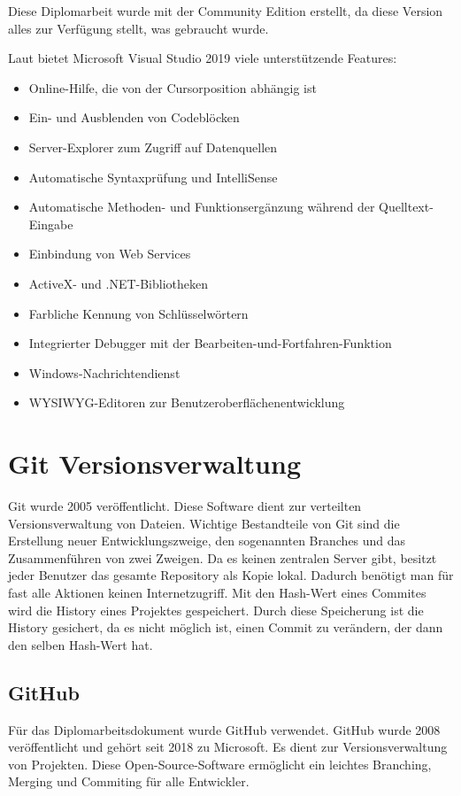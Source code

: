 Diese Diplomarbeit wurde mit der Community Edition erstellt, da diese Version alles zur Verfügung stellt, was gebraucht wurde. \autocite{wikiVisualStudio}

Laut \autocite{wikiVisualStudio} bietet Microsoft Visual Studio 2019 viele unterstützende Features:

\begin{itemize}
	\item Online-Hilfe, die von der Cursorposition abhängig ist
	\item Ein- und Ausblenden von Codeblöcken
	\item Server-Explorer zum Zugriff auf Datenquellen
	\item Automatische Syntaxprüfung und IntelliSense
	\item Automatische Methoden- und Funktionsergänzung während der Quelltext-Eingabe
	\item Einbindung von Web Services
	\item ActiveX- und .NET-Bibliotheken
	\item Farbliche Kennung von Schlüsselwörtern
	\item Integrierter Debugger mit der Bearbeiten-und-Fortfahren-Funktion
	\item Windows-Nachrichtendienst
	\item WYSIWYG-Editoren zur Benutzeroberflächenentwicklung
\end{itemize}
\section{Git Versionsverwaltung}
Git wurde 2005 veröffentlicht. Diese Software dient zur verteilten Versionsverwaltung von Dateien. Wichtige Bestandteile von Git sind die Erstellung neuer Entwicklungszweige, den sogenannten Branches und das Zusammenführen von zwei Zweigen. Da es keinen zentralen Server gibt, besitzt jeder Benutzer das gesamte Repository als Kopie lokal. Dadurch benötigt man für fast alle Aktionen keinen Internetzugriff. Mit den Hash-Wert eines Commites wird die History eines Projektes gespeichert. Durch diese Speicherung ist die History gesichert, da es nicht möglich ist, einen Commit zu verändern, der dann den selben Hash-Wert hat. \autocite{wikiGit}

\subsection{GitHub}
Für das Diplomarbeitsdokument wurde GitHub verwendet. GitHub wurde 2008 veröffentlicht und gehört seit 2018 zu Microsoft. Es dient zur Versionsverwaltung von Projekten. Diese Open-Source-Software ermöglicht ein leichtes Branching, Merging und Commiting für alle Entwickler. \autocite{wikiGitHub}

